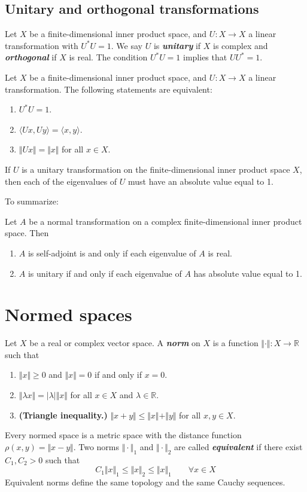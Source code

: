 \documentclass{article}
\theoremstyle{definition}
\newcommand{\R}{\mathbb{R}}
\begin{document}
	\subsection{Unitary and orthogonal transformations}
	Let $X$ be a finite-dimensional inner product space, and $U:X\to X$ a linear transformation with $U^*U=1$. We say $U$ is \textbf{\textit{unitary}} if $X$ is complex and \textbf{\textit{orthogonal}} if $X$ is real. The condition $U^*U=1$ implies that $UU^*=1$.
	
	\begin{thm}
		Let $X$ be a finite-dimensional inner product space, and $U:X\to X$ a linear transformation. The following statements are equivalent:
		\begin{enumerate}
			\item $U^*U=1$.
			\item $\langle Ux,Uy\rangle=\langle x,y\rangle$.
			\item $\Vert Ux\Vert=\Vert x\Vert$ for all $x\in X$.
		\end{enumerate}
	\end{thm}
	\begin{thm}
		If $U$ is a unitary transformation on the finite-dimensional inner product space $X$, then each of the eigenvalues of $U$ must have an absolute value equal to 1.
	\end{thm}
	To summarize:
	\begin{thm}
		Let $A$ be a normal transformation on a complex finite-dimensional inner product space. Then
		\begin{enumerate}
			\item $A$ is self-adjoint is and only if each eigenvalue of $A$ is real.
			\item $A$ is unitary if and only if each eigenvalue of $A$ has absolute value equal to 1.
		\end{enumerate}
	\end{thm}

\section{Normed spaces}
	Let $X$ be a real or complex vector space. A \textbf{\textit{norm}} on $X$ is a function $\Vert \cdot\Vert:X\to\R$ such that
\begin{enumerate}
	\item $\Vert x\Vert\geq0$ and $\Vert x\Vert=0$ if and only if $x=0$.
	\item $\Vert\lambda x\Vert=|\lambda|\Vert x\Vert$ for all $x\in X$ and $\lambda\in\R$.
	\item \textbf{(Triangle inequality.)} $\Vert x+y\Vert\leq\Vert x\Vert+\Vert y\Vert$ for all $x,y\in X$.
\end{enumerate}
Every normed space is a metric space with the distance function $\rho(x,y)=\Vert x-y\Vert$. Two norms $\Vert\cdot\Vert_1$ and $\Vert\cdot\Vert_2$ are called \textbf{\textit{equivalent}} if there exist $C_1,C_2>0$ such that
\[C_1\Vert x\Vert_1\leq \Vert x\Vert_2\leq \Vert x\Vert_1\qquad\forall x\in X\]
Equivalent norms define the same topology and the same Cauchy sequences.
\end{document}
